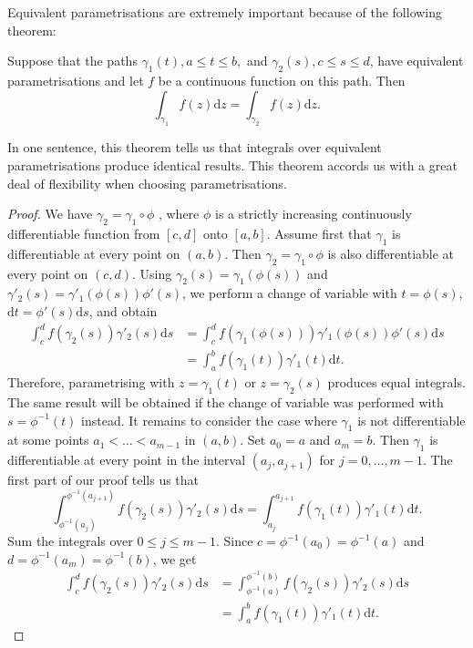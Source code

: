 \begin{defn}
Equivalent parametrisations are extremely important because of the following theorem:
\begin{thm}
Suppose that the paths $\gamma_1(t), a \leq t \leq b,$ and $\gamma_2(s), c \leq s \leq d$, have equivalent parametrisations and let $f$ be a continuous function on this path. Then
$$\int_{\gamma_1} f(z) \mathrm{d}z = \int_{\gamma_2} f(z) \mathrm{d}z.$$
\end{thm}
In one sentence, this theorem tells us that integrals over equivalent parametrisations produce identical results.
This theorem accords us with a great deal of flexibility when choosing parametrisations.

\begin{proof}
We have $\gamma_2 = \gamma_1 \circ \phi$ , where $\phi$ is a strictly increasing continuously differentiable function from $[c,d]$ onto $[a,b]$. Assume first that $\gamma_1$ is differentiable at every point on $(a,b)$. Then $\gamma_2 =\gamma_1 \circ \phi$ is also differentiable at every point on $(c,d)$.
Using $\gamma_2(s) =\gamma_1(\phi (s))$ and $\gamma'_2(s) = \gamma'_1(\phi(s))\phi'(s)$, we perform a change of variable with $t = \phi(s)$, $\mathrm{d}t = \phi'(s)\mathrm{d}s$, and obtain 
\begin{align*}
\int_c^d f(\gamma_2(s))\gamma'_2(s)\mathrm{d}s &= \int_c^d f(\gamma_1(\phi(s)))\gamma'_1(\phi(s))\phi'(s)\mathrm{d}s \\ 
&= \int_a^b f(\gamma_1(t))\gamma'_1(t)\mathrm{d}t.
\end{align*}
Therefore, parametrising with $z = \gamma_1(t)$ or $z = \gamma_2(s)$ produces equal integrals.
The same result will be obtained if the change of variable was performed with $s = \phi^{-1}(t)$ instead.
It remains to consider the case where $\gamma_1$ is not differentiable at some points $a_1 < \ldots < a_{m-1}$ in $(a,b)$.  Set $a_0 =a$ and $a_m =b$. Then $\gamma_1$ is differentiable at every point in the interval $(a_j,a_{j+1})$ for $j = 0,\ldots,m-1$.  The first part of our proof tells us that
$$\int_{\phi^{-1}(a_j)}^{\phi^{-1}(a_{j+1})} f(\gamma_2(s))\gamma'_2(s)\mathrm{d}s = \int_{a_j}^{a_{j+1}} f(\gamma_1(t))\gamma'_1(t)\mathrm{d}t.$$ 
Sum the integrals over $0 \leq j \leq m-1$. Since $c = \phi^{-1}(a_0) = \phi^{-1}(a)$ and $d = \phi^{-1}(a_m) = \phi^{-1}(b)$, we get
\begin{align*}
\int_c^d f(\gamma_2(s))\gamma'_2(s)\mathrm{d}s &= \int_{\phi^{-1}(a)}^{\phi^{-1}(b)} f(\gamma_2(s))\gamma'_2(s)\mathrm{d}s \\ 
&= \int_a^b f(\gamma_1(t))\gamma'_1(t)\mathrm{d}t.

\end{align*}
\end{proof}
\end{defn}
